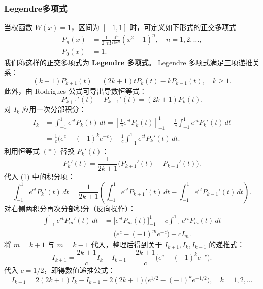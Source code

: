 \documentclass{article}
\begin{document}
\subsubsection{Legendre多项式}
当权函数 $W(x)=1$，区间为 $[-1,1]$ 时，可定义如下形式的正交多项式
\[
\begin{aligned}
P_n(x) &= \frac{1}{2^n n!} \frac{\mathrm{d}^n}{\mathrm{d}x^n} (x^2-1)^n, \quad n=1,2,\dots,\\
P_0(x) &= 1.
\end{aligned}
\]
我们称这样的正交多项式为 \textbf{Legendre 多项式}。
Legendre 多项式满足三项递推关系：
\[
(k+1)P_{k+1}(t) = (2k+1)t P_k(t) - k P_{k-1}(t), \quad k\ge 1.
\]
此外，由 Rodrigues 公式可导出导数恒等式：
\[
P_{k+1}'(t) - P_{k-1}'(t) = (2k+1) P_k(t). \tag{*}
\]
对 $I_k$ 应用一次分部积分：
\begin{align*}
I_k &= \int_{-1}^{1} e^{c t} P_k(t)\,dt 
     = \left[ \frac{1}{c} e^{c t} P_k(t) \right]_{-1}^{1} - \frac{1}{c} \int_{-1}^{1} e^{c t} P_k'(t)\,dt \\
    &= \frac{1}{c}\bigl( e^{c} - (-1)^k e^{-c} \bigr) - \frac{1}{c} \int_{-1}^{1} e^{c t} P_k'(t)\,dt. \tag{1}
\end{align*}
利用恒等式 $(*)$ 替换 $P_k'(t)$：
\[
P_k'(t) = \frac{1}{2k+1}\bigl( P_{k+1}'(t) - P_{k-1}'(t) \bigr).
\]
代入 (1) 中的积分项：
\[
\int_{-1}^{1} e^{c t} P_k'(t)\,dt 
= \frac{1}{2k+1} \left( \int_{-1}^{1} e^{c t} P_{k+1}'(t)\,dt - \int_{-1}^{1} e^{c t} P_{k-1}'(t)\,dt \right).
\]
对右侧两积分再次分部积分（反向操作）：
\begin{align*}
\int_{-1}^{1} e^{c t} P_{m}'(t)\,dt 
&= \bigl[ e^{c t} P_m(t) \bigr]_{-1}^{1} - c \int_{-1}^{1} e^{c t} P_m(t)\,dt \\
&= \bigl( e^{c} - (-1)^m e^{-c} \bigr) - c I_m.
\end{align*}
将 $m=k+1$ 与 $m=k-1$ 代入，整理后得到关于 $I_{k+1}, I_k, I_{k-1}$ 的递推式：
\[
I_{k+1} = \frac{2k+1}{c} I_k - I_{k-1} - \frac{2k+1}{c}\bigl( e^{c} - (-1)^k e^{-c} \bigr). \tag{2}
\]
代入 $c = 1/2$，即得数值递推公式：
\[
\boxed{
I_{k+1} = 2(2k+1) I_k - I_{k-1} - 2(2k+1)\bigl( e^{1/2} - (-1)^k e^{-1/2} \bigr), \quad k=1,2,\dots
}
\]
\end{document}
